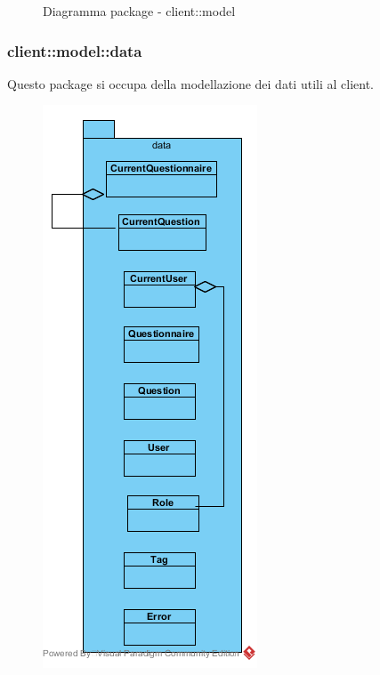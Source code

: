 \begin{center}
\begin{figure}[H]
		\caption{Diagramma package - client::model}
	\end{figure}
\end{center}\subsubsection{client::model::data}
Questo package si occupa della modellazione dei dati utili al client.\begin{center}
	\begin{figure}[H]
		\centering \includegraphics[scale=4, max width=\textwidth, max height=\myheight]{../img/diagrammiClassi/client/model/data.png}

\end{figure}
\end{center}
